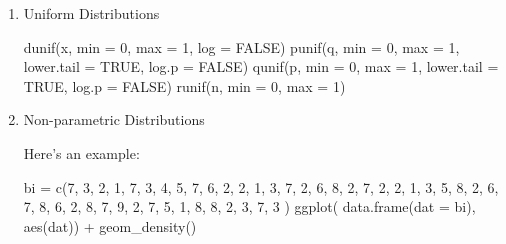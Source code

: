 \documentclass[
]{article}
\newenvironment{Shaded}{}{}
\newcommand{\AttributeTok}[1]{\textcolor[rgb]{0.49,0.56,0.16}{#1}}
\newcommand{\ConstantTok}[1]{\textcolor[rgb]{0.53,0.00,0.00}{#1}}
\newcommand{\DecValTok}[1]{\textcolor[rgb]{0.25,0.63,0.44}{#1}}
\newcommand{\FunctionTok}[1]{\textcolor[rgb]{0.02,0.16,0.49}{#1}}
\newcommand{\NormalTok}[1]{#1}
\newcommand{\OtherTok}[1]{\textcolor[rgb]{0.00,0.44,0.13}{#1}}
\newcommand{\SpecialCharTok}[1]{\textcolor[rgb]{0.25,0.44,0.63}{#1}}
\begin{document}
\begin{enumerate}
\def\labelenumi{\arabic{enumi}.}
\item
  Uniform Distributions

\begin{Shaded}
\begin{Highlighting}[]
\FunctionTok{dunif}\NormalTok{(x, }\AttributeTok{min =} \DecValTok{0}\NormalTok{, }\AttributeTok{max =} \DecValTok{1}\NormalTok{, }\AttributeTok{log =} \ConstantTok{FALSE}\NormalTok{)}
\FunctionTok{punif}\NormalTok{(q, }\AttributeTok{min =} \DecValTok{0}\NormalTok{, }\AttributeTok{max =} \DecValTok{1}\NormalTok{, }\AttributeTok{lower.tail =} \ConstantTok{TRUE}\NormalTok{, }\AttributeTok{log.p =} \ConstantTok{FALSE}\NormalTok{)}
\FunctionTok{qunif}\NormalTok{(p, }\AttributeTok{min =} \DecValTok{0}\NormalTok{, }\AttributeTok{max =} \DecValTok{1}\NormalTok{, }\AttributeTok{lower.tail =} \ConstantTok{TRUE}\NormalTok{, }\AttributeTok{log.p =} \ConstantTok{FALSE}\NormalTok{)}
\FunctionTok{runif}\NormalTok{(n, }\AttributeTok{min =} \DecValTok{0}\NormalTok{, }\AttributeTok{max =} \DecValTok{1}\NormalTok{)}
\end{Highlighting}
\end{Shaded}
\item
  Non-parametric Distributions

  Here's an example:

\begin{Shaded}
\begin{Highlighting}[]
\NormalTok{bi }\OtherTok{=}
	\FunctionTok{c}\NormalTok{(}\DecValTok{7}\NormalTok{, }\DecValTok{3}\NormalTok{, }\DecValTok{2}\NormalTok{, }\DecValTok{1}\NormalTok{, }\DecValTok{7}\NormalTok{, }
    \DecValTok{3}\NormalTok{, }\DecValTok{4}\NormalTok{, }\DecValTok{5}\NormalTok{, }\DecValTok{7}\NormalTok{, }\DecValTok{6}\NormalTok{,}
    \DecValTok{2}\NormalTok{, }\DecValTok{2}\NormalTok{, }\DecValTok{1}\NormalTok{, }\DecValTok{3}\NormalTok{, }\DecValTok{7}\NormalTok{, }
    \DecValTok{2}\NormalTok{, }\DecValTok{6}\NormalTok{, }\DecValTok{8}\NormalTok{, }\DecValTok{2}\NormalTok{, }\DecValTok{7}\NormalTok{,}
    \DecValTok{2}\NormalTok{, }\DecValTok{2}\NormalTok{, }\DecValTok{1}\NormalTok{, }\DecValTok{3}\NormalTok{, }\DecValTok{5}\NormalTok{, }
    \DecValTok{8}\NormalTok{, }\DecValTok{2}\NormalTok{, }\DecValTok{6}\NormalTok{, }\DecValTok{7}\NormalTok{, }\DecValTok{8}\NormalTok{, }
    \DecValTok{6}\NormalTok{, }\DecValTok{2}\NormalTok{, }\DecValTok{8}\NormalTok{, }\DecValTok{7}\NormalTok{, }\DecValTok{9}\NormalTok{, }
    \DecValTok{2}\NormalTok{, }\DecValTok{7}\NormalTok{, }\DecValTok{5}\NormalTok{, }\DecValTok{1}\NormalTok{, }\DecValTok{8}\NormalTok{, }
    \DecValTok{8}\NormalTok{, }\DecValTok{2}\NormalTok{, }\DecValTok{3}\NormalTok{, }\DecValTok{7}\NormalTok{, }\DecValTok{3}
\NormalTok{   )}
\FunctionTok{ggplot}\NormalTok{( }
  \FunctionTok{data.frame}\NormalTok{(}\AttributeTok{dat =}\NormalTok{ bi),}
  \FunctionTok{aes}\NormalTok{(dat)) }\SpecialCharTok{+} 
\FunctionTok{geom\_density}\NormalTok{()}
\end{Highlighting}
\end{Shaded}
\end{enumerate}
\end{document}
